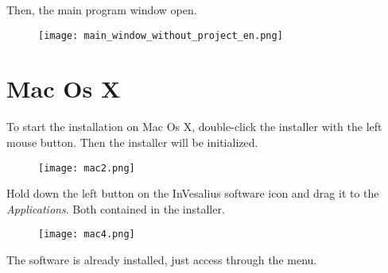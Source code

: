 Then, the main program window open.

\begin{figure}[!htb]
\centering
\texttt{[image: main\_window\_without\_project\_en.png]}
\end{figure}

\section{Mac Os X}

To start the installation on Mac Os X, double-click the installer with the left mouse button.
Then the installer will be initialized.

\begin{figure}[!htb]
\centering
\texttt{[image: mac2.png]}
\end{figure}

Hold down the left button on the InVesalius software icon and drag it to the \textit{Applications}. Both contained in the installer.

\begin{figure}[!htb]
\centering
\texttt{[image: mac4.png]}
\end{figure}

The software is already installed, just access through the menu.